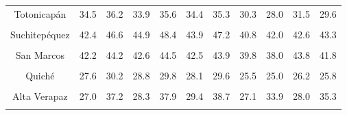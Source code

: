 {\begin{tabular}[t]{ccccccccccc}
Totonicapán & 34.5 & 36.2 & 33.9 & 35.6 & 34.4 & 35.3 & 30.3 & 28.0 & 31.5 & 29.6\\
\cellcolor[HTML]{B6B3FF}{Quetzaltenango} & \cellcolor[HTML]{B6B3FF}{51.4} & \cellcolor[HTML]{B6B3FF}{54.1} & \cellcolor[HTML]{B6B3FF}{52.8} & \cellcolor[HTML]{B6B3FF}{54.8} & \cellcolor[HTML]{B6B3FF}{54.2} & \cellcolor[HTML]{B6B3FF}{56.2} & \cellcolor[HTML]{B6B3FF}{52.3} & \cellcolor[HTML]{B6B3FF}{52.2} & \cellcolor[HTML]{B6B3FF}{56.0} & \cellcolor[HTML]{B6B3FF}{55.3}\\
Suchitepéquez & 42.4 & 46.6 & 44.9 & 48.4 & 43.9 & 47.2 & 40.8 & 42.0 & 42.6 & 43.3\\
\cellcolor[HTML]{B6B3FF}{Retalhuleu} & \cellcolor[HTML]{B6B3FF}{53.6} & \cellcolor[HTML]{B6B3FF}{54.1} & \cellcolor[HTML]{B6B3FF}{89.6} & \cellcolor[HTML]{B6B3FF}{56.8} & \cellcolor[HTML]{B6B3FF}{57.0} & \cellcolor[HTML]{B6B3FF}{55.8} & \cellcolor[HTML]{B6B3FF}{53.7} & \cellcolor[HTML]{B6B3FF}{50.7} & \cellcolor[HTML]{B6B3FF}{55.2} & \cellcolor[HTML]{B6B3FF}{52.1}\\
San Marcos & 42.2 & 44.2 & 42.6 & 44.5 & 42.5 & 43.9 & 39.8 & 38.0 & 43.8 & 41.8\\
\cellcolor[HTML]{B6B3FF}{Huehuetenango} & \cellcolor[HTML]{B6B3FF}{24.7} & \cellcolor[HTML]{B6B3FF}{26.4} & \cellcolor[HTML]{B6B3FF}{24.8} & \cellcolor[HTML]{B6B3FF}{25.4} & \cellcolor[HTML]{B6B3FF}{24.4} & \cellcolor[HTML]{B6B3FF}{25.0} & \cellcolor[HTML]{B6B3FF}{22.0} & \cellcolor[HTML]{B6B3FF}{20.7} & \cellcolor[HTML]{B6B3FF}{23.9} & \cellcolor[HTML]{B6B3FF}{22.7}\\
Quiché & 27.6 & 30.2 & 28.8 & 29.8 & 28.1 & 29.6 & 25.5 & 25.0 & 26.2 & 25.8\\
\cellcolor[HTML]{B6B3FF}{Baja Verapaz} & \cellcolor[HTML]{B6B3FF}{36.6} & \cellcolor[HTML]{B6B3FF}{41.1} & \cellcolor[HTML]{B6B3FF}{37.1} & \cellcolor[HTML]{B6B3FF}{41.2} & \cellcolor[HTML]{B6B3FF}{37.2} & \cellcolor[HTML]{B6B3FF}{39.1} & \cellcolor[HTML]{B6B3FF}{34.2} & \cellcolor[HTML]{B6B3FF}{33.4} & \cellcolor[HTML]{B6B3FF}{36.4} & \cellcolor[HTML]{B6B3FF}{36.3}\\
Alta Verapaz & 27.0 & 37.2 & 28.3 & 37.9 & 29.4 & 38.7 & 27.1 & 33.9 & 28.0 & 35.3\\
\cellcolor[HTML]{B6B3FF}{Petén} & \cellcolor[HTML]{B6B3FF}{40.4} & \cellcolor[HTML]{B6B3FF}{39.0} & \cellcolor[HTML]{B6B3FF}{43.7} & \cellcolor[HTML]{B6B3FF}{40.9} & \cellcolor[HTML]{B6B3FF}{42.1} & \cellcolor[HTML]{B6B3FF}{39.9} & \cellcolor[HTML]{B6B3FF}{36.3} & \cellcolor[HTML]{B6B3FF}{30.1} & \cellcolor[HTML]{B6B3FF}{40.4} & \cellcolor[HTML]{B6B3FF}{35.1}\\

\end{tabular}}
